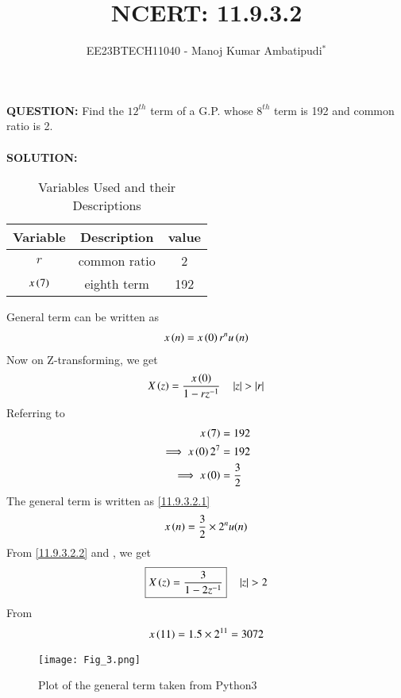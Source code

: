 \documentclass[journal,12pt,twocolumn]{IEEEtran}
\theoremstyle{remark}
\begin{document}

\vspace{3cm}
\title{NCERT: 11.9.3.2}
\author{EE23BTECH11040 - Manoj Kumar Ambatipudi$^{*}$%
}
\maketitle
\newpage
\bigskip
\renewcommand{\thefigure}{\theenumi}
\renewcommand{\thetable}{\theenumi}
\textbf{QUESTION:}
Find the $12^{th}$ term of a G.P. whose $8^{th}$ term is 192 and common ratio is 2.\\\\
\textbf{SOLUTION:}
\begin{table}[h!!]
\renewcommand\thetable{1}
    \centering
    \begin{tabular}{|c|c|c|}
    \hline
        Variable&             Description&value\\\hline
             $r$&            common ratio&2    \\\hline
     $x\left(7\right)$&              eighth term&192  \\\hline
    \end{tabular}
    \caption{Variables Used and their Descriptions}
    \label{tab 11.9.3.2.1}
\end{table}


General term can be written as 
\begin{align}
    x\left(n\right)=x\left(0\right)r^{n}u\left(n\right)\label{11.9.3.2.1}
\end{align}
Now on Z-transforming, we get
\begin{align}
    X\left(z\right)=\frac{x\left(0\right)}{1-rz^{-1}}\label{11.9.3.2.2} \quad   \left\vert z\right\vert>\left\vert r\right\vert
\end{align}
Referring to 
\begin{align}
         x\left(7\right)&=192\\
\implies x\left(0\right)2^{7}&=192\\
\implies x\left(0\right)&=\frac{3}{2}
\end{align}
The general term is written as \eqref{11.9.3.2.1}
\begin{align}
    x\left(n\right)=\frac{3}{2}\times2^{n}u(n)
\end{align}
From \eqref{11.9.3.2.2} and , we get
\begin{align}
   \boxed{X\left(z\right)=\frac{3}{1-2z^{-1}}}\quad   \left\vert z\right\vert>2
\end{align}
From  
\begin{align}
x\left(11\right) = 1.5\times2^{11} = 3072
\end{align}
\begin{figure}[h]
\renewcommand\thefigure{1} 
    \centering
    \texttt{[image: Fig\_3.png]}
    \caption{Plot of the general term taken from Python3}
    \label{fig:1}
\end{figure}
\end{document}
